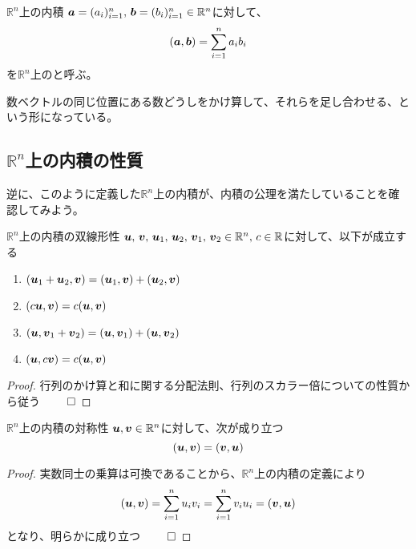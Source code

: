 \documentclass[../../../topic_linear-algebra]{subfiles}
\begin{document}
\begin{definition}{$\mathbb{R}^n$上の内積}
  $\vb*{a} = (a_i)_{i=1}^n,\, \vb*{b} = (b_i)_{i=1}^n \in \mathbb{R}^n$に対して、
  \begin{equation*}
    (\vb*{a}, \vb*{b}) = \sum_{i=1}^n a_i b_i
  \end{equation*}
  を$\mathbb{R}^n$上のと呼ぶ。
\end{definition}

数ベクトルの同じ位置にある数どうしをかけ算して、それらを足し合わせる、という形になっている。

\subsection{$\mathbb{R}^n$上の内積の性質}

逆に、このように定義した$\mathbb{R}^n$上の内積が、内積の公理を満たしていることを確認してみよう。

\begin{theorem*}{$\mathbb{R}^n$上の内積の双線形性}
  $\vb*{u},\,\vb*{v},\,\vb*{u}_1,\,\vb*{u}_2,\,\vb*{v}_1,\,\vb*{v}_2 \in \mathbb{R}^n,\,c\in \mathbb{R}$に対して、以下が成立する
  \begin{enumerate}[label=\romanlabel]
    \item $(\vb*{u}_1 + \vb*{u}_2, \vb*{v}) = (\vb*{u}_1, \vb*{v}) + (\vb*{u}_2, \vb*{v})$
    \item $(c\vb*{u}, \vb*{v}) = c(\vb*{u}, \vb*{v})$
    \item $(\vb*{u}, \vb*{v}_1 + \vb*{v}_2) = (\vb*{u}, \vb*{v}_1) + (\vb*{u}, \vb*{v}_2)$
    \item $(\vb*{u}, c\vb*{v}) = c(\vb*{u}, \vb*{v})$
  \end{enumerate}
\end{theorem*}

\begin{proof}
  行列のかけ算と和に関する分配法則、行列のスカラー倍についての性質から従う $\qed$
\end{proof}

\br

\begin{theorem*}{$\mathbb{R}^n$上の内積の対称性}
  $\vb*{u}, \vb*{v} \in \mathbb{R}^n$に対して、次が成り立つ
  \begin{equation*}
    (\vb*{u}, \vb*{v}) = (\vb*{v}, \vb*{u})
  \end{equation*}
\end{theorem*}

\begin{proof}
  実数同士の乗算は可換であることから、$\mathbb{R}^n$上の内積の定義により
  \begin{equation*}
    (\vb*{u}, \vb*{v}) = \sum_{i=1}^n u_i v_i = \sum_{i=1}^n v_i u_i = (\vb*{v}, \vb*{u})
  \end{equation*}
  となり、明らかに成り立つ $\qed$
\end{proof}
\end{document}
